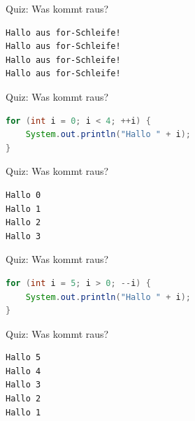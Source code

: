 \documentclass[18pt]{beamer}
\begin{document}
\begin{frame}[fragile]{Quiz: Was kommt raus?}
    \begin{block}{}
        \begin{lstlisting}
Hallo aus for-Schleife!
Hallo aus for-Schleife!
Hallo aus for-Schleife!
Hallo aus for-Schleife!
        \end{lstlisting}
    \end{block}
\end{frame}
\begin{frame}[fragile]{Quiz: Was kommt raus?}
    \begin{exampleblock}{}
        \begin{lstlisting}[language=Java]
for (int i = 0; i < 4; ++i) {
    System.out.println("Hallo " + i);
}
        \end{lstlisting}
    \end{exampleblock}
\end{frame}

\begin{frame}[fragile]{Quiz: Was kommt raus?}
    \begin{block}{}
        \begin{lstlisting}
Hallo 0
Hallo 1
Hallo 2
Hallo 3
        \end{lstlisting}
    \end{block}
\end{frame}
\begin{frame}[fragile]{Quiz: Was kommt raus?}
    \begin{exampleblock}{}
        \begin{lstlisting}[language=Java]
for (int i = 5; i > 0; --i) {
    System.out.println("Hallo " + i);
}
        \end{lstlisting}
    \end{exampleblock}
\end{frame}

\begin{frame}[fragile]{Quiz: Was kommt raus?}
    \begin{block}{}
        \begin{lstlisting}
Hallo 5
Hallo 4
Hallo 3
Hallo 2
Hallo 1
        \end{lstlisting}
    \end{block}
\end{frame}
\end{document}
